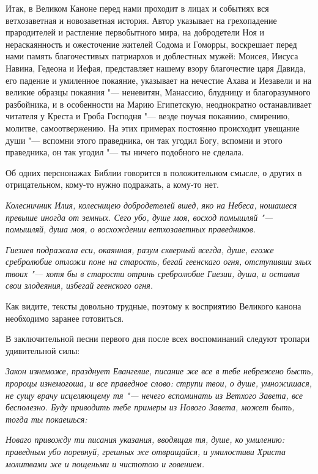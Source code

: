 Итак, в Великом Каноне перед нами проходит в
лицах и событиях вся ветхозаветная и
новозаветная история. Автор указывает на
грехопадение прародителей и растление
первобытного мира, на добродетели Ноя и
нераскаянность и ожесточение жителей Содома и
Гоморры, воскрешает перед нами память
благочестивых патриархов и доблестных мужей:
Моисея, Иисуса Навина, Гедеона и Иефая,
представляет нашему взору благочестие царя
Давида, его падение и умиленное покаяние,
указывает на нечестие Ахава и Иезавели и на
великие образцы покаяния "--- неневитян, Манассию,
блудницу и благоразумного разбойника, и в
особенности на Марию Египетскую, неоднократно
останавливает читателя у Креста и Гроба Господня
"--- везде поучая покаянию, смирению, молитве,
самоотвержению. На этих примерах постоянно
происходит увещание души "--- вспомни этого
праведника, он так угодил Богу, вспомни и этого
праведника, он так угодил "--- ты ничего подобного
не сделала. 


Об одних перснонажах Библии говорится в
положительном смысле, о других в отрицательном,
кому-то нужно подражать, а кому-то нет. 


\itshape Колесничник Илия, колесницею добродетелей
вшед, яко на Небеса, ношашеся превыше иногда от
земных. Сего убо, душе моя, восход помышляй\normalfont{} "---
помышляй, душа моя, о восхождении ветхозаветных
праведников. 


\itshape Гиезиев подражала еси, окаянная, разум скверный
всегда, душе, егоже сребролюбие отложи поне на
старость, бегай геенскаго огня, отступивши злых
твоих\normalfont{} "--- хотя бы в старости отринь сребролюбие
Гиезии, душа, и оставив свои злодеяния, избегай
геенского огня. 


Как видите, тексты довольно трудные, поэтому к
восприятию Великого канона необходимо заранее
готовиться. 


В заключительной песни первого дня после всех
воспоминаний следуют тропари удивительной силы: 


\itshape Закон изнеможе, празднует Евангелие, писание же
все в тебе небрежено бысть, пророцы изнемогоша, и
все праведное слово: струпи твои, о душе,
умножишася, не сущу врачу исцеляющему тя\normalfont{} "---
нечего вспоминать из Ветхого Завета, все
бесполезно. Буду приводить тебе примеры из
Нового Завета, может быть, тогда ты покаешься: 


\itshape Новаго привожду ти писания указания, вводящая
тя, душе, ко умилению: праведным убо поревнуй,
грешных же отвращайся, и умилостиви Христа
молитвами же и пощеньми и чистотою и говением. \normalfont{}



